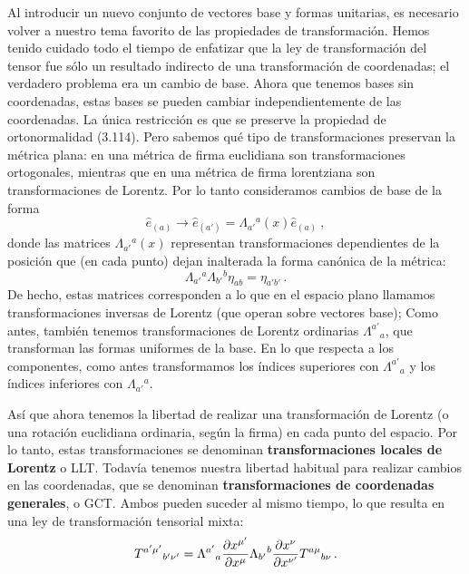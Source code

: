 \documentclass[11pt,b5paper,openany,twoside]{book}
\newcommand{\e}[1]{\hat{e}_{(#1)}}
\begin{document}
Al introducir un nuevo conjunto de vectores base y formas unitarias, es necesario volver a nuestro tema favorito de las propiedades de transformación.
Hemos tenido cuidado todo el tiempo de enfatizar que la ley de transformación del tensor fue sólo un resultado indirecto de una transformación de coordenadas; el verdadero problema era un cambio de base.
Ahora que tenemos bases sin coordenadas, estas bases se pueden cambiar independientemente de las coordenadas.
La única restricción es que se preserve la propiedad de ortonormalidad (3.114).
Pero sabemos qué tipo de transformaciones preservan la métrica plana: en una métrica de firma euclidiana son transformaciones ortogonales, mientras que en una métrica de firma lorentziana son transformaciones de Lorentz.
Por lo tanto consideramos cambios de base de la forma
\begin{equation}
\e{a}\rightarrow \e{a'} = \Lambda_{a'}{}^a(x) \e{a}\ ,\label{3.125}
\end{equation}
donde las matrices $\Lambda_{a'}{}^a(x)$ representan transformaciones dependientes de la posición que (en cada punto) dejan inalterada la forma canónica de la métrica:
\begin{equation}
\Lambda_{a'}{}^a\Lambda_{b'}{}^b\eta_{ab} = \eta_{a'b'}\,.
\label{3.126}
\end{equation}
De hecho, estas matrices corresponden a lo que en el espacio plano llamamos transformaciones inversas de Lorentz (que operan sobre vectores base); Como antes, también tenemos transformaciones de Lorentz ordinarias $\Lambda^{a'}{}_a$, que transforman las formas uniformes de la base.
En lo que respecta a los componentes, como antes transformamos los índices superiores con $\Lambda^{a'}{}_a$ y los índices inferiores con $\Lambda_{a'}{}^a$.

Así que ahora tenemos la libertad de realizar una transformación de Lorentz (o una rotación euclidiana ordinaria, según la firma) en cada punto del espacio.
Por lo tanto, estas transformaciones se denominan {\bf transformaciones locales de Lorentz} o LLT.
Todavía tenemos nuestra libertad habitual para realizar cambios en las coordenadas, que se denominan {\bf transformaciones de coordenadas generales}, o GCT.
Ambos pueden suceder al mismo tiempo, lo que resulta en una ley de transformación tensorial mixta:
\begin{equation}
T^{a'\mu'}{}_{b'\nu'} = \Lambda^{a'}{}_a {{\partial x^{\mu'}}\over
{\partial x^\mu}} \Lambda_{b'}{}^b {{\partial x^{\nu}}\over
{\partial x^{\nu'}}}T^{a\mu}{}_{b\nu}\,.\label{3.127}
\end{equation}
\end{document}

